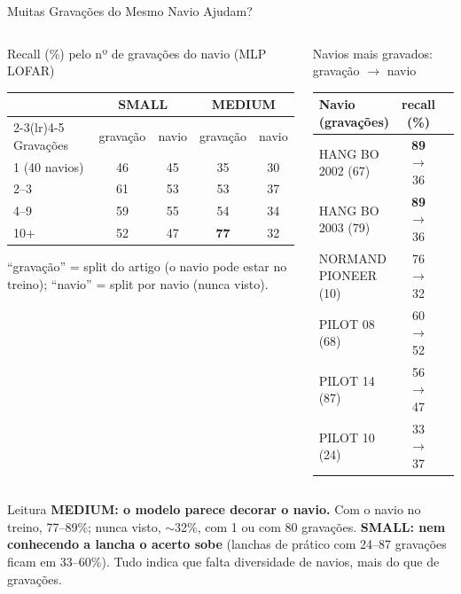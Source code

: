 \documentclass[aspectratio=169]{beamer}
\newcommand{\cahi}[1]{\cellcolor{green!30}\textbf{#1}}
\newcommand{\calo}[1]{\cellcolor{red!20}#1}
\begin{document}
\begin{frame}{Muitas Gravações do Mesmo Navio Ajudam?}
    \footnotesize
    \begin{columns}[t]
        \begin{block}{\small Recall (\%) pelo nº de gravações do navio (MLP LOFAR)}
            \scriptsize
            \centering
            \setlength{\tabcolsep}{3pt}
            \begin{tabular}{lcccc}
            \toprule
             & \multicolumn{2}{c}{SMALL} & \multicolumn{2}{c}{MEDIUM} \\
            \cmidrule(lr){2-3}\cmidrule(lr){4-5}
            Gravações & gravação & navio & gravação & navio \\
            \midrule
            1 (40 navios) & 46 & 45 & 35 & 30 \\
            2--3 & 61 & 53 & 53 & 37 \\
            4--9 & 59 & 55 & 54 & 34 \\
            10+ & 52 & 47 & \cahi{77} & \calo{32} \\
            \bottomrule
            \end{tabular}

            \vspace{0.05cm}
            {\tiny ``gravação'' = split do artigo (o navio pode estar no treino); ``navio'' = split por navio (nunca visto).\par}
        \end{block}
        \begin{block}{\small Navios mais gravados: gravação $\to$ navio}
            \scriptsize
            \centering
            \setlength{\tabcolsep}{3pt}
            \begin{tabular}{lcc}
            \toprule
            Navio (gravações) & recall (\%) \\
            \midrule
            HANG BO 2002 (67) & \cahi{89} $\to$ \calo{36} \\
            HANG BO 2003 (79) & \cahi{89} $\to$ \calo{36} \\
            NORMAND PIONEER (10) & 76 $\to$ 32 \\
            PILOT 08 (68) & 60 $\to$ 52 \\
            PILOT 14 (87) & 56 $\to$ 47 \\
            PILOT 10 (24) & 33 $\to$ 37 \\
            \bottomrule
            \end{tabular}
        \end{block}
    \end{columns}
    \vspace{0.1cm}
    \begin{alertblock}{Leitura}
        \scriptsize
        \textbf{MEDIUM: o modelo parece decorar o navio.} Com o navio no treino, 77--89\%; nunca visto, $\sim$32\%, com 1 ou com 80 gravações. \textbf{SMALL: nem conhecendo a lancha o acerto sobe} (lanchas de prático com 24--87 gravações ficam em 33--60\%). Tudo indica que falta diversidade de navios, mais do que de gravações.
    \end{alertblock}
\end{frame}
\end{document}
